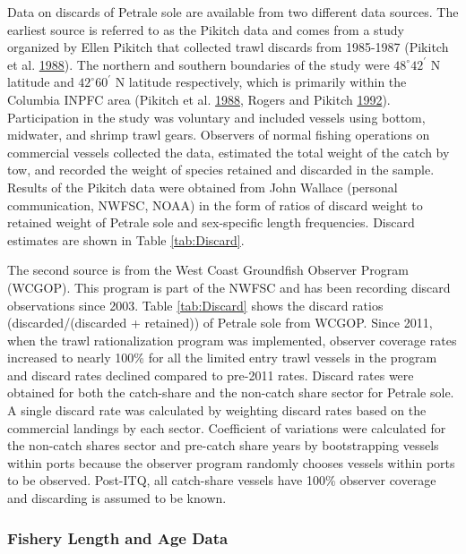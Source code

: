 \documentclass[12pt,]{article}
\begin{document}
Data on discards of Petrale sole are available from two different data
sources. The earliest source is referred to as the Pikitch data and
comes from a study organized by Ellen Pikitch that collected trawl
discards from 1985-1987 (Pikitch et al.
\protect\hyperlink{ref-pikitch_evaluation_1988}{1988}). The northern and
southern boundaries of the study were \(48^\circ 42^\prime\) N latitude
and \(42^\circ 60^\prime\) N latitude respectively, which is primarily
within the Columbia INPFC area (Pikitch et al.
\protect\hyperlink{ref-pikitch_evaluation_1988}{1988}, Rogers and
Pikitch \protect\hyperlink{ref-rogers_numerical_1992}{1992}).
Participation in the study was voluntary and included vessels using
bottom, midwater, and shrimp trawl gears. Observers of normal fishing
operations on commercial vessels collected the data, estimated the total
weight of the catch by tow, and recorded the weight of species retained
and discarded in the sample. Results of the Pikitch data were obtained
from John Wallace (personal communication, NWFSC, NOAA) in the form of
ratios of discard weight to retained weight of Petrale sole and
sex-specific length frequencies. Discard estimates are shown in Table
\ref{tab:Discard}.

The second source is from the West Coast Groundfish Observer Program
(WCGOP). This program is part of the NWFSC and has been recording
discard observations since 2003. Table \ref{tab:Discard} shows the
discard ratios (discarded/(discarded + retained)) of Petrale sole from
WCGOP. Since 2011, when the trawl rationalization program was
implemented, observer coverage rates increased to nearly 100\% for all
the limited entry trawl vessels in the program and discard rates
declined compared to pre-2011 rates. Discard rates were obtained for
both the catch-share and the non-catch share sector for Petrale sole. A
single discard rate was calculated by weighting discard rates based on
the commercial landings by each sector. Coefficient of variations were
calculated for the non-catch shares sector and pre-catch share years by
bootstrapping vessels within ports because the observer program randomly
chooses vessels within ports to be observed. Post-ITQ, all catch-share
vessels have 100\% observer coverage and discarding is assumed to be
known.

\subsubsection{Fishery Length and Age
Data}\label{fishery-length-and-age-data}
\end{document}
